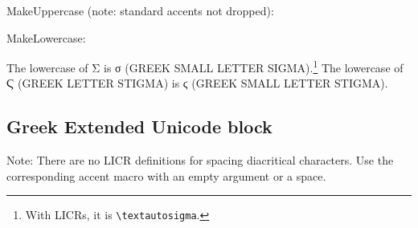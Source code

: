 \documentclass[a4paper]{article}
\begin{document}
\greekandcoptic

\noindent MakeUppercase (note: standard accents not dropped):

\MakeUppercase{\greekandcoptic}

\noindent MakeLowercase:

\MakeLowercase{\greekandcoptic}

The lowercase of Σ is σ (GREEK SMALL LETTER SIGMA).\footnote{%
With LICRs, it is \texttt{\textbackslash textautosigma}.}
The lowercase of Ϛ (GREEK LETTER STIGMA) is ϛ (GREEK SMALL LETTER STIGMA).


\subsection{Greek Extended Unicode block}

Note: There are no LICR definitions for spacing diacritical characters.
Use the corresponding accent macro with an empty argument or a space.


\medskip
\end{document}
